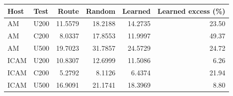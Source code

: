 \begin{tabular}{llrrrr}
\toprule
Host & Test & Route & Random & Learned & Learned excess (\%) \\
\midrule
AM & U200 & 11.5579 & 18.2188 & 14.2735 & 23.50 \\
AM & C200 & 8.0337 & 17.8553 & 11.9997 & 49.37 \\
AM & U500 & 19.7023 & 31.7857 & 24.5729 & 24.72 \\
ICAM & U200 & 10.8307 & 12.6999 & 11.5086 & 6.26 \\
ICAM & C200 & 5.2792 & 8.1126 & 6.4374 & 21.94 \\
ICAM & U500 & 16.9091 & 21.1741 & 18.3969 & 8.80 \\
\bottomrule
\end{tabular}
